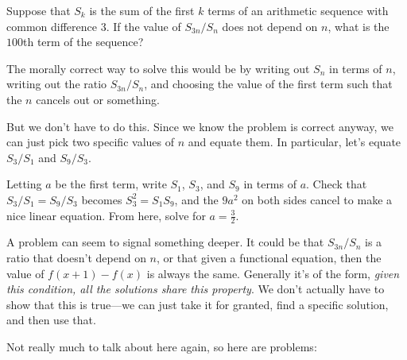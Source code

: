 \documentclass[11pt,paper=letter]{scrartcl}
\begin{document}
\begin{exboxed}
  Suppose that $S_k$ is the sum of the first $k$ terms of an arithmetic sequence with common difference $3$. If the value of $S_{3n}/S_n$ does not depend on $n$, what is the $100$th term of the sequence?
\end{exboxed}

The morally correct way to solve this would be by writing out $S_n$ in terms of $n$, writing out the ratio $S_{3n}/S_n$, and choosing the value of the first term such that the $n$ cancels out or something.

But we don't have to do this. Since we know the problem is correct anyway, we can just pick two specific values of $n$ and equate them. In particular, let's equate $S_3/S_1$ and $S_9/S_3$.

\begin{exrboxed}
  Letting $a$ be the first term, write $S_1$, $S_3$, and $S_9$ in terms of $a$. Check that $S_3/S_1 = S_9/S_3$ becomes $S_3^2 = S_1S_9$, and the $9a^2$ on both sides cancel to make a nice linear equation. From here, solve for $a = \frac{3}{2}$.
\end{exrboxed}

A problem can seem to signal something deeper. It could be that $S_{3n}/S_n$ is a ratio that doesn't depend on $n$, or that given a functional equation, then the value of $f(x+1) - f(x)$ is always the same. Generally it's of the form, \textit{given this condition, all the solutions share this property}. We don't actually have to show that this is true---we can just take it for granted, find a specific solution, and then use that.

Not really much to talk about here again, so here are problems:
\end{document}
